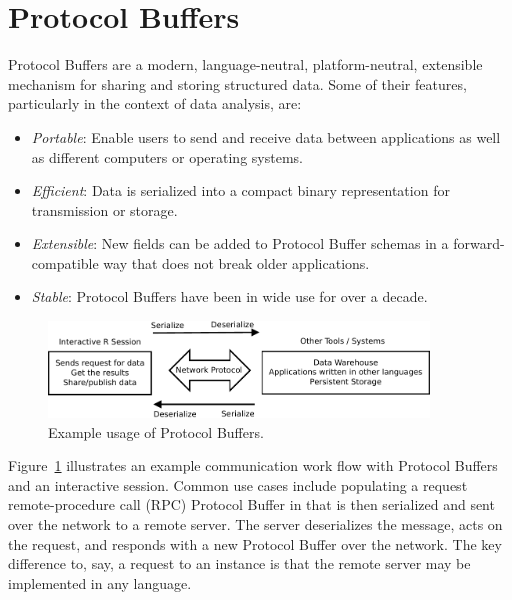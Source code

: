 \documentclass[article]{jss}
\begin{document}
\section{Protocol Buffers}
\label{sec:protobuf}

Protocol Buffers are a modern, language-neutral, platform-neutral,
extensible mechanism for sharing and storing structured data. Some of their
features, particularly in the context of data analysis, are:
%
\begin{itemize}
\item \emph{Portable}:  Enable users to send and receive data between
  applications as well as different computers or operating systems.
\item \emph{Efficient}:  Data is serialized into a compact binary
  representation for transmission or storage.
\item \emph{Extensible}:  New fields can be added to Protocol Buffer schemas
  in a forward-compatible way that does not break older applications.
\item \emph{Stable}:  Protocol Buffers have been in wide use for over a
  decade.
\end{itemize}
%
\begin{figure}[t!]
\centering
\includegraphics[width=0.9\textwidth]{protobuf-distributed-system-crop.pdf}
\caption{Example usage of Protocol Buffers.}
\label{fig:protobuf-distributed-usecase}
\end{figure}
%
Figure~\ref{fig:protobuf-distributed-usecase} illustrates an example
communication work flow with Protocol Buffers and an interactive  session.
Common use cases include populating a request remote-procedure call (RPC)
Protocol Buffer in  that is then serialized and sent over the network to a
remote server.  The server deserializes the message, acts on the
request, and responds with a new Protocol Buffer over the network.
The key difference to, say, a request to an 
\citep{Urbanek:2003:Rserve,CRAN:Rserve} instance is that
the remote server may be implemented in any language.
\end{document}
